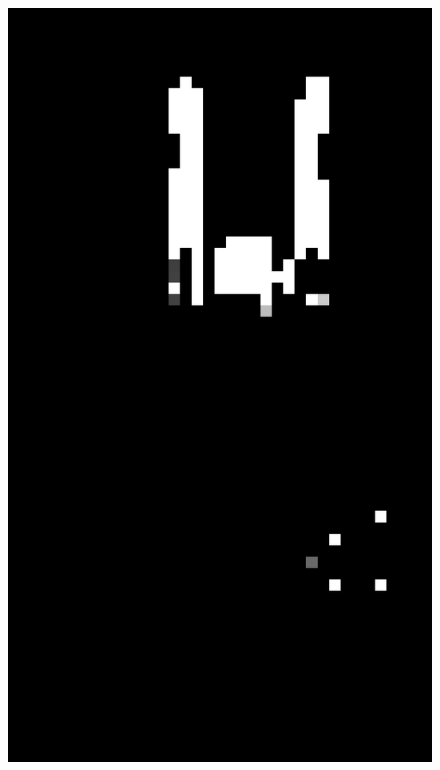 \begin{figure}[!htbp]
    \centering
        \begin{minipage}{\sizeImg\textwidth}
            \includegraphics[width=\textwidth]{figuras/mao_barra/pixel.png}
        \end{minipage}
        \begin{minipage}{\sizeImg\textwidth}

\end{minipage}
\end{figure}
